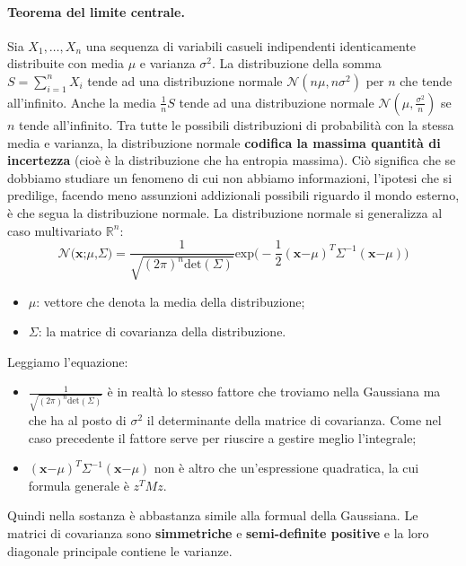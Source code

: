 \paragraph{Teorema del limite centrale.} Sia $X_1,\dots,X_n$ una sequenza di variabili casueli indipendenti identicamente distribuite con media $\mu$ e varianza $\sigma^2$. La distribuzione della somma $S=\sum_{i=1}^nX_i$ tende ad una distribuzione normale $\mathcal{N}(n\mu,n\sigma^2)$ per $n$ che tende all'infinito. Anche la media $\frac{1}{n}S$ tende ad una distribuzione normale $\mathcal{N}(\mu,\frac{\sigma^2}{n})$ se $n$ tende all'infinito.
\newline
\newline
Tra tutte le possibili distribuzioni di probabilità con la stessa media e varianza, la distribuzione normale \textbf{codifica la massima quantità di incertezza} (cioè è la distribuzione che ha entropia massima). Ciò significa che se dobbiamo studiare un fenomeno di cui non abbiamo informazioni, l'ipotesi che si predilige, facendo meno assunzioni addizionali possibili riguardo il mondo esterno, è che segua la distribuzione normale.
\newline
\newline
La distribuzione normale si generalizza al caso multivariato $\mathbb{R}^n$:
\begin{equation}
    \mathcal{N}(\textbf{x;$\mu$,$\Sigma$)}=\frac{1}{\sqrt{(2\pi)^n\text{det}(\Sigma)}}\text{exp}\Big(-\frac{1}{2}(\textbf{x$-\mu$})^T\textbf{$\Sigma$}^{-1}(\textbf{x$-\mu$}) \Big)
\end{equation}
\begin{itemize}
    \item \textbf{$\mu$}: vettore che denota la media della distribuzione;
    \item \textbf{$\Sigma$}: la matrice di covarianza della distribuzione.
\end{itemize}
Leggiamo l'equazione:
\begin{itemize}
    \item $\frac{1}{\sqrt{(2\pi)^n\text{det}(\Sigma)}}$ è in realtà lo stesso fattore che troviamo nella Gaussiana ma che ha al posto di $\sigma^2$ il determinante della matrice di covarianza. Come nel caso precedente il fattore serve per riuscire a gestire meglio l'integrale;
    \item $(\textbf{x$-\mu$})^T\textbf{$\Sigma$}^{-1}(\textbf{x$-\mu$})$ non è altro che un'espressione quadratica, la cui formula generale è $z^TMz$.
\end{itemize}
Quindi nella sostanza è abbastanza simile alla formual della Gaussiana.
Le matrici di covarianza sono \textbf{simmetriche} e \textbf{semi-definite positive} e la loro diagonale principale contiene le varianze.


